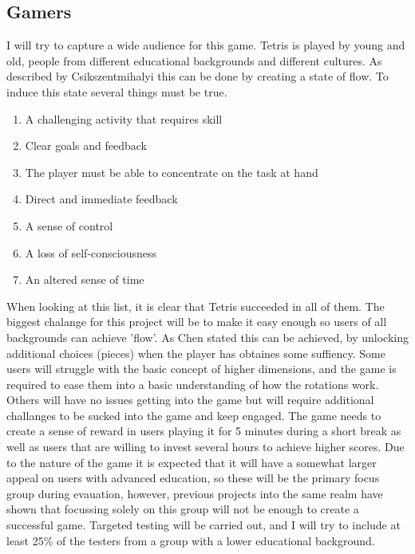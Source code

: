 \documentclass{article}
\begin{document}
\subsection{Gamers}
I will try to capture a wide audience for this game. Tetris is played by young and old, people from different educational backgrounds and different cultures.
As described by Csikszentmihalyi \cite{flow} this can be done by creating a state of flow. To induce this state several things must be true.
\begin{enumerate}
    \item A challenging activity that requires skill
    \item Clear goals and feedback
    \item The player must be able to concentrate on the task at hand
    \item Direct and immediate feedback
    \item A sense of control
    \item A loss of self-consciousness
    \item An altered sense of time
\end{enumerate}
When looking at this list, it is clear that Tetris succeeded in all of them. The biggest chalange for this project will be to make it easy enough so users of all backgrounds can achieve 'flow'. As Chen \cite{flow_2} stated this can be achieved, by unlocking additional choices (pieces) when the player has obtaines some suffiency. Some users will struggle with the basic concept of higher dimensions, and the game is required to ease them into a basic understanding of how the rotations work. Others will have no issues getting into the game but will require additional challanges to be sucked into the game and keep engaged. The game needs to create a sense of reward in users playing it for 5 minutes during a short break as well as users that are willing to invest several hours to achieve higher scores. Due to the nature of the game it is expected that it will have a somewhat larger appeal on users with advanced education, so these will be the primary focus group during evauation, however, previous projects into the same realm have shown that focussing solely on this group will not be enough to create a successful game. Targeted testing will be carried out, and I will try to include at least 25\% of the testers from a group with a lower educational background.
\end{document}
